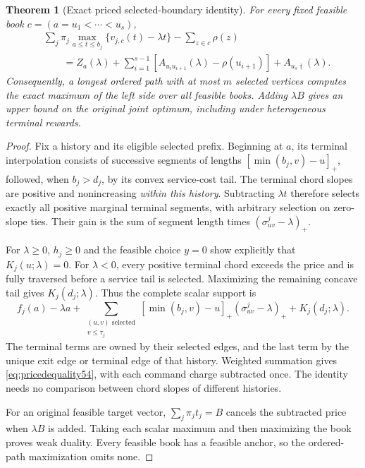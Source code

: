 \documentclass[11pt,letterpaper]{article}
\newtheorem{theorem}{Theorem}[section]
\theoremstyle{definition}\newtheorem{remark}[theorem]{Remark}
\begin{document}
\begin{theorem}[Exact priced selected-boundary identity]\label{thm:price54}
For every fixed feasible book $c=(a=u_1<\cdots<u_s)$,
\begin{equation}\label{eq:pricedequality54}
 \begin{split}
 &\sum_j\pi_j\max_{a\leq t\leq b_j}\{v_{j,c}(t)-\lambda t\}-\sum_{z\in c}\rho(z)\\
 &\qquad=Z_a(\lambda)+\sum_{i=1}^{s-1}[A_{u_i u_{i+1}}(\lambda)-\rho(u_{i+1})]+A_{u_s\dagger}(\lambda).
\end{split}
\end{equation}
Consequently, a longest ordered path with at most $m$ selected vertices computes the exact maximum of the left side over all feasible books. Adding $\lambda B$ gives an upper bound on the original joint optimum, including under heterogeneous terminal rewards.
\end{theorem}
\begin{proof}
Fix a history and its eligible selected prefix. Beginning at $a$, its terminal interpolation consists of successive segments of lengths $[\min(b_j,v)-u]_+$, followed, when $b_j>d_j$, by its convex service-cost tail. The terminal chord slopes are positive and nonincreasing \emph{within this history}. Subtracting $\lambda t$ therefore selects exactly all positive marginal terminal segments, with arbitrary selection on zero-slope ties. Their gain is the sum of segment length times $(\sigma^j_{uv}-\lambda)_+$.

For $\lambda\geq0$, $h_j\geq0$ and the feasible choice $y=0$ show explicitly that $K_j(u;\lambda)=0$. For $\lambda<0$, every positive terminal chord exceeds the price and is fully traversed before a service tail is selected. Maximizing the remaining concave tail gives $K_j(d_j;\lambda)$. Thus the complete scalar support is
\[
 f_j(a)-\lambda a+
 \sum_{\substack{(u,v)\text{ selected}\\v\leq\tau_j}}
 [\min(b_j,v)-u]_+(\sigma^j_{uv}-\lambda)_+ +K_j(d_j;\lambda).
\]
The terminal terms are owned by their selected edges, and the last term by the unique exit edge or terminal edge of that history. Weighted summation gives \eqref{eq:pricedequality54}, with each command charge subtracted once. The identity needs no comparison between chord slopes of different histories.

For an original feasible target vector, $\sum_j\pi_jt_j=B$ cancels the subtracted price when $\lambda B$ is added. Taking each scalar maximum and then maximizing the book proves weak duality. Every feasible book has a feasible anchor, so the ordered-path maximization omits none.
\end{proof}
\end{document}
